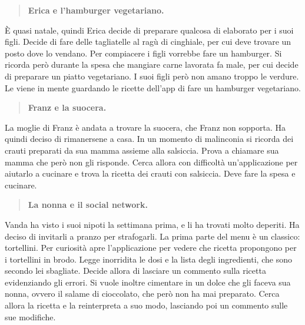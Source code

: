 \begin{quote}
	\textbf{Erica e l'hamburger vegetariano.}
\end{quote}
È quasi natale, quindi Erica decide di preparare qualcosa di elaborato per i
suoi figli. Decide di fare delle tagliatelle al ragù di cinghiale, per cui deve
trovare un posto dove lo vendano. Per compiacere i figli vorrebbe fare un hamburger.
Si ricorda però durante la spesa che mangiare carne lavorata fa male, per cui
decide di preparare un piatto vegetariano. I suoi figli però non amano troppo
le verdure. Le viene in mente guardando le ricette dell’app di fare un hamburger vegetariano.

\begin{quote}
	\textbf{Franz e la suocera.}
\end{quote}
La moglie di Franz è andata a trovare la suocera, che Franz non sopporta.
Ha quindi deciso di rimanersene a casa. In un momento di malinconia si ricorda
dei crauti preparati da sua mamma assieme alla salsiccia. Prova a chiamare sua
mamma che però non gli risponde. Cerca allora con difficoltà un’applicazione per
aiutarlo a cucinare e trova la ricetta dei crauti con salsiccia.  Deve fare la spesa e cucinare.

\begin{quote}
	\textbf{La nonna e il social network.}
\end{quote}
Vanda ha visto i suoi nipoti la settimana prima, e li ha trovati molto deperiti.
Ha deciso di invitarli a pranzo per strafogarli. La prima parte del menu è un
classico: tortellini. Per curiosità apre l’applicazione per vedere che ricetta
propongono per i tortellini in brodo. Legge inorridita le dosi e la lista degli 
ingredienti, che sono secondo lei sbagliate. Decide allora di lasciare un commento 
sulla ricetta evidenziando gli errori. Si vuole inoltre cimentare in un dolce che gli faceva sua nonna,
ovvero il salame di cioccolato, che però non ha mai preparato. Cerca allora la 
ricetta e la reinterpreta a suo modo, lasciando poi un commento sulle sue modifiche.
